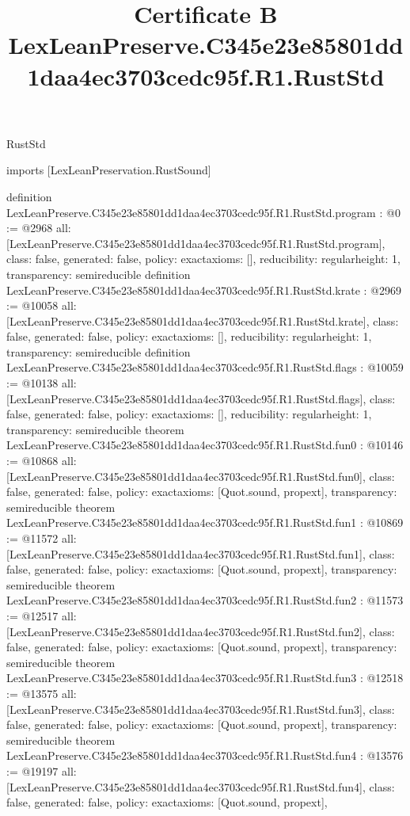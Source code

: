\begin{lexlean}{RustStd}
\title{Certificate B LexLeanPreserve.C345e23e85801dd1daa4ec3703cedc95f.R1.RustStd}
\begin{coremodule}
imports [LexLeanPreservation.RustSound]

definition LexLeanPreserve.C345e23e85801dd1daa4ec3703cedc95f.R1.RustStd.program : @0 := @2968 {
  all: [LexLeanPreserve.C345e23e85801dd1daa4ec3703cedc95f.R1.RustStd.program],
  class: false,
  generated: false,
  policy: exact{axioms: []},
  reducibility: regular{height: 1},
  transparency: semireducible
}
definition LexLeanPreserve.C345e23e85801dd1daa4ec3703cedc95f.R1.RustStd.krate : @2969 := @10058 {
  all: [LexLeanPreserve.C345e23e85801dd1daa4ec3703cedc95f.R1.RustStd.krate],
  class: false,
  generated: false,
  policy: exact{axioms: []},
  reducibility: regular{height: 1},
  transparency: semireducible
}
definition LexLeanPreserve.C345e23e85801dd1daa4ec3703cedc95f.R1.RustStd.flags : @10059 := @10138 {
  all: [LexLeanPreserve.C345e23e85801dd1daa4ec3703cedc95f.R1.RustStd.flags],
  class: false,
  generated: false,
  policy: exact{axioms: []},
  reducibility: regular{height: 1},
  transparency: semireducible
}
theorem LexLeanPreserve.C345e23e85801dd1daa4ec3703cedc95f.R1.RustStd.fun0 : @10146 := @10868 {
  all: [LexLeanPreserve.C345e23e85801dd1daa4ec3703cedc95f.R1.RustStd.fun0],
  class: false,
  generated: false,
  policy: exact{axioms: [Quot.sound, propext]},
  transparency: semireducible
}
theorem LexLeanPreserve.C345e23e85801dd1daa4ec3703cedc95f.R1.RustStd.fun1 : @10869 := @11572 {
  all: [LexLeanPreserve.C345e23e85801dd1daa4ec3703cedc95f.R1.RustStd.fun1],
  class: false,
  generated: false,
  policy: exact{axioms: [Quot.sound, propext]},
  transparency: semireducible
}
theorem LexLeanPreserve.C345e23e85801dd1daa4ec3703cedc95f.R1.RustStd.fun2 : @11573 := @12517 {
  all: [LexLeanPreserve.C345e23e85801dd1daa4ec3703cedc95f.R1.RustStd.fun2],
  class: false,
  generated: false,
  policy: exact{axioms: [Quot.sound, propext]},
  transparency: semireducible
}
theorem LexLeanPreserve.C345e23e85801dd1daa4ec3703cedc95f.R1.RustStd.fun3 : @12518 := @13575 {
  all: [LexLeanPreserve.C345e23e85801dd1daa4ec3703cedc95f.R1.RustStd.fun3],
  class: false,
  generated: false,
  policy: exact{axioms: [Quot.sound, propext]},
  transparency: semireducible
}
theorem LexLeanPreserve.C345e23e85801dd1daa4ec3703cedc95f.R1.RustStd.fun4 : @13576 := @19197 {
  all: [LexLeanPreserve.C345e23e85801dd1daa4ec3703cedc95f.R1.RustStd.fun4],
  class: false,
  generated: false,
  policy: exact{axioms: [Quot.sound, propext]},
}
\end{coremodule}
\end{lexlean}
